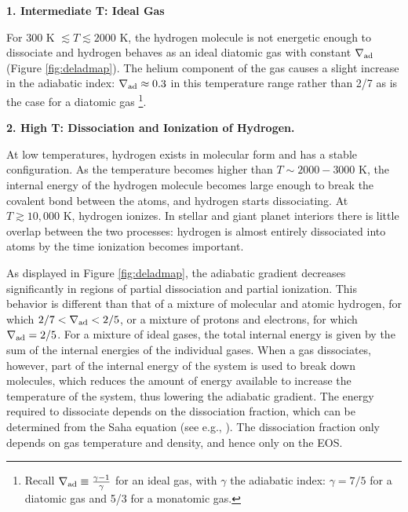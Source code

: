 \documentclass[apj]{emulateapj}
\newcommand{\delad}{\nabla_{\rm ad}}
\begin{document}


\vspace{0.2in}

\textbf{1. Intermediate T: Ideal Gas}

For $300$ K $\lesssim T \lesssim 2000$ K, the hydrogen molecule is not energetic enough to dissociate and hydrogen behaves as an ideal diatomic gas with constant $\delad$ (Figure \ref{fig:deladmap}). The helium component of the gas causes a slight increase in the adiabatic index: $\delad \approx 0.3$ in this temperature range rather than 2/7 as is the case for a diatomic gas \footnote{Recall $\delad \equiv \frac{\gamma-1}{\gamma}$ for an ideal gas, with $\gamma$ the adiabatic index: $\gamma=7/5$ for a diatomic gas and 5/3 for a monatomic gas.}.

\vspace{0.2in}

\textbf{2. High T: Dissociation and Ionization of Hydrogen.}

At low temperatures, hydrogen exists in molecular form and has a stable configuration. As the temperature becomes higher than $T \sim 2000-3000$ K, the internal energy of the hydrogen molecule becomes large enough to break the covalent bond between the atoms, and hydrogen starts dissociating. At $T \gtrsim 10,000$ K, hydrogen ionizes. In stellar and giant planet interiors there is little overlap between the two processes: hydrogen is almost entirely dissociated into atoms by the time ionization becomes important. 

As displayed in Figure \ref{fig:deladmap}, the adiabatic gradient decreases significantly in regions of partial dissociation and partial ionization. This behavior is different than that of a mixture of molecular and atomic hydrogen, for which $2/7<\delad<2/5$, or a mixture of protons and electrons, for which $\delad=2/5$. For a mixture of ideal gases, the total internal energy is given by the sum of the internal energies of the individual gases. When a gas dissociates, however, part of the internal energy of the system is used to break down molecules, which reduces the amount of energy available to increase the temperature of the system, thus lowering the adiabatic gradient. The energy required to dissociate depends on the dissociation fraction, which can be determined from the Saha equation (see e.g., \citealt{kippenhahn90}). The dissociation fraction only depends on gas temperature and density, and hence only on the EOS. 
\end{document}
